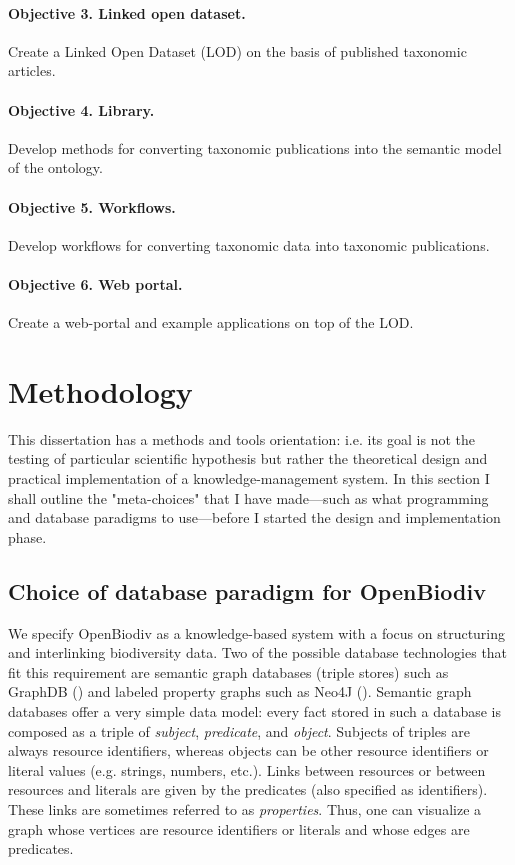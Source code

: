 \paragraph{Objective 3. Linked open dataset.} Create a Linked Open Dataset (LOD) on the basis of published taxonomic articles.
\paragraph{Objective 4. Library.} Develop methods for converting taxonomic publications into the semantic model of the ontology.
\paragraph{Objective 5. Workflows.} Develop workflows for converting taxonomic data into taxonomic publications.
\paragraph{Objective 6. Web portal.} Create a web-portal and example applications on top of the LOD.


\section*{Methodology}

This dissertation has a methods and tools orientation: i.e. its goal is not the testing of particular scientific hypothesis but rather the theoretical design and practical implementation of a knowledge-management system. In this section I shall outline the "meta-choices" that I have made---such as what programming and database paradigms to use---before I started the design and implementation phase. 

\subsection*{Choice of database paradigm for OpenBiodiv}

We specify OpenBiodiv as a knowledge-based system with a focus on structuring and interlinking biodiversity data. Two of the possible database technologies that fit this requirement are semantic graph databases (triple stores) such as GraphDB (\cite{ontotext_graphdb_2018}) and labeled property graphs such as Neo4J (\cite{neo4j_developers_neo4j_2012}).  Semantic graph databases offer a very simple data model: every fact stored in such a database is composed as a triple of \emph{subject}, \emph{predicate}, and \emph{object}. Subjects of triples are always resource identifiers, whereas objects can be other resource identifiers or literal values (e.g. strings, numbers, etc.).  Links between resources or between resources and literals are given by the predicates (also specified as identifiers). These links are sometimes referred to as \emph{properties}. Thus, one can visualize a graph whose vertices are resource identifiers or literals and whose edges are predicates.

